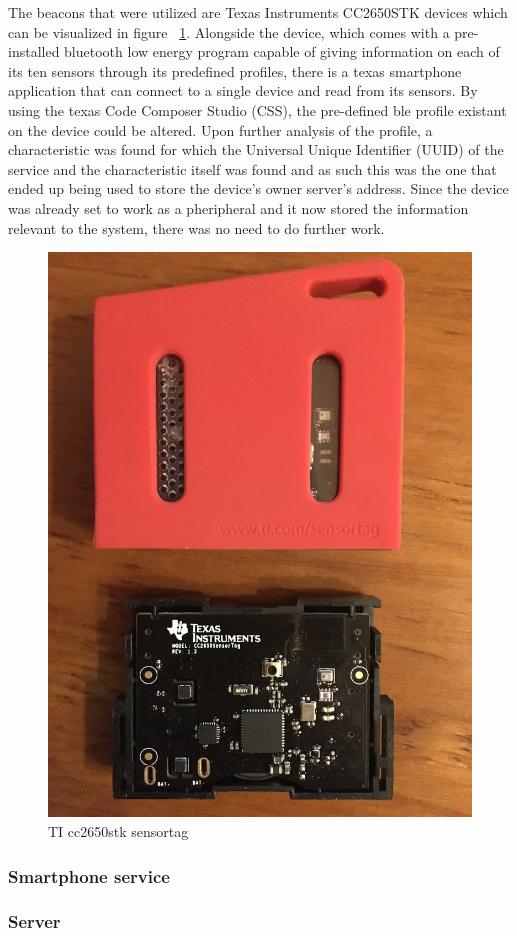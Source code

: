 \documentclass[a4paper]{IEEEtran}
\begin{document}
The beacons that were utilized are Texas Instruments CC2650STK devices which can be visualized in figure ~\ref{fig:beacon}. Alongside the device, which comes with a pre-installed bluetooth low energy program capable of giving information on each of its ten sensors through its predefined profiles, there is a texas smartphone application that can connect to a single device and read from its sensors. By using the texas Code Composer Studio (CSS), the pre-defined ble profile existant on the device could be altered. Upon further analysis of the profile, a characteristic was found for which the Universal Unique Identifier (UUID) of the service and the characteristic itself was found and as such this was the one that ended up being used to store the device's owner server's address. Since the device was already set to work as a pheripheral and it now stored the information relevant to the system, there was no need to do further work.

\begin{figure}
	\centering
		\includegraphics[width=0.5\linewidth]{figures/beacon.jpg}
	\caption[TI cc2650stk sensortag]{TI cc2650stk sensortag}
	\label{fig:beacon}
\end{figure}

\subsubsection{ Smartphone service}
\label{subsec:service}


\subsubsection{ Server}
\label{subsec:server}
\end{document}
